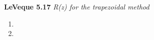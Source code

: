 \textbf{LeVeque 5.17} \textit{R(z) for the trapezoidal method}

\begin{enumerate}
  \item 
  \pagebreak
  \item 
\end{enumerate} 
